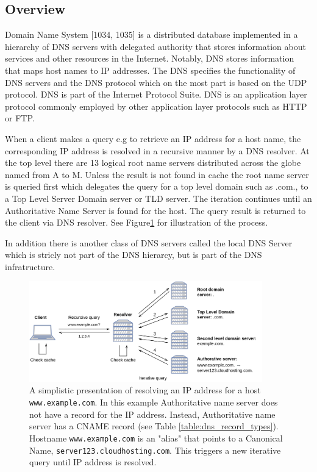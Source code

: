 \subsection{Overview}
Domain Name System [1034, 1035] is a distributed database implemented in a hierarchy of DNS servers with delegated authority that stores information about services and other resources in the Internet. Notably, DNS stores information that maps host names to IP addresses. The DNS specifies the functionality of DNS servers and the DNS protocol which on the most part is based on the UDP protocol. DNS is part of the Internet Protocol Suite. DNS is an application layer protocol commonly employed by other application layer protocols such as HTTP or FTP. \citep{kurose_ross}\cite{tanenbaum} 

When a client makes a query e.g to retrieve an IP address for a host name, the corresponding IP address is resolved in a recursive manner by a DNS resolver. At the top level there are 13 logical root name servers distributed across the globe named from A to M. Unless the result is not found in cache the root name server is queried first which delegates the query for a top level domain such as .com., to a Top Level Server Domain server or TLD server. The iteration continues until an Authoritative Name Server is found for the host. The query result is returned to the client via DNS resolver. See Figure\ref{fig:resolving} for illustration of the process. \citep{kurose_ross}\cite{tanenbaum} 

In addition there is another class of DNS servers called the local DNS Server which is stricly not part of the DNS hierarcy, but is part of the DNS infratructure. \citep{kurose_ross}

\begin{figure}[htb]
  \begin{center}
    \includegraphics[width=0.9\textwidth]{resolving.png}
    \caption{A simplistic presentation of resolving an IP address for a host \texttt{www.example.com}. In this example Authoritative name server does not have a record for the IP address. Instead, Authoritative name server has a CNAME record (see Table \ref{table:dns_record_types}). Hostname \texttt{www.example.com} is an "alias" that points to a Canonical Name, \texttt{server123.cloudhosting.com}. This triggers a new iterative query until IP address is resolved.}
    \label{fig:resolving}
  \end{center}
\end{figure}


